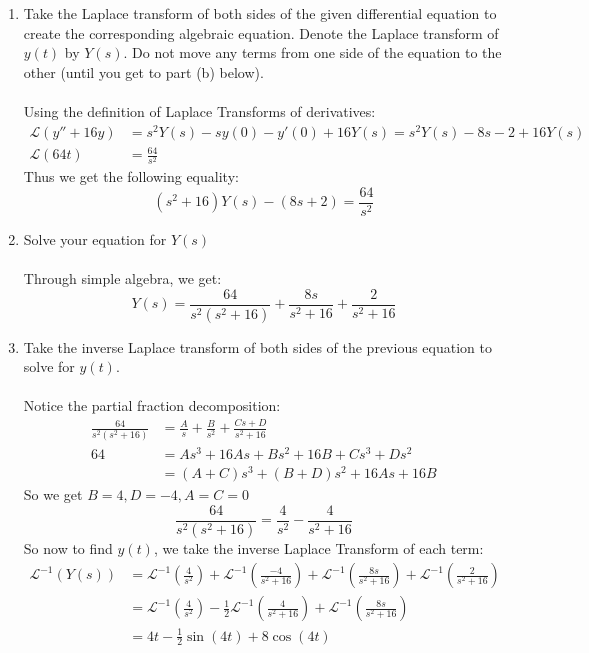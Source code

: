 \documentclass[12pt]{article}
\begin{document}
\begin{enumerate}[label = (\alph*)]
	\item Take the Laplace transform of both sides of the given differential equation to create the corresponding algebraic equation. Denote the Laplace transform of $y(t)$ by $Y(s)$. Do not move any terms from one side of the equation to the other (until you get to part (b) below).
	\\ \\
	Using the definition of Laplace Transforms of derivatives:
	\begin{align*}
		\mathcal{L}(y'' + 16y) &= s^2Y(s) - sy(0) - y'(0) + 16Y(s) = s^2Y(s) - 8s - 2 + 16Y(s) \\
		\mathcal{L}(64t) &= \frac{64}{s^2}
	\end{align*}
	Thus we get the following equality:
	$$
	(s^2 + 16)Y(s) - (8s + 2) = \frac{64}{s^2}
	$$
	\item Solve your equation for $Y(s)$
	\\ \\
	Through simple algebra, we get:
	$$
	Y(s) = \frac{64}{s^2(s^2 + 16)} + \frac{8s}{s^2 + 16} + \frac{2}{s^2 + 16}
	$$
	\item Take the inverse Laplace transform of both sides of the previous equation to solve for $y(t)$.
	\\ \\
	Notice the partial fraction decomposition:
	\begin{align*}
	\frac{64}{s^2(s^2 + 16)} &= \frac{A}{s} + \frac{B}{s^2} + \frac{Cs + D}{s^2+16} \\
	64 &= As^3 + 16As + Bs^2 + 16B + Cs^3 + Ds^2 \\
	&= (A+C)s^3 + (B+D)s^2 + 16As + 16B
	\end{align*}
	So we get $B = 4, D = -4, A = C = 0$
	$$
	\frac{64}{s^2(s^2 + 16)} = \frac{4}{s^2} - \frac{4}{s^2+16}
	$$
	So now to find $y(t)$, we take the inverse Laplace Transform of each term:
	\begin{align*}
	\mathcal{L}^{-1}(Y(s)) &= \mathcal{L}^{-1}\left(\frac{4}{s^2}\right) + \mathcal{L}^{-1}\left( \frac{-4}{s^2+16}\right) + \mathcal{L}^{-1}\left(\frac{8s}{s^2 + 16}\right) + \mathcal{L}^{-1}\left(\frac{2}{s^2 + 16}\right) \\
	&= \mathcal{L}^{-1}\left(\frac{4}{s^2}\right) - \frac{1}{2}\mathcal{L}^{-1}\left( \frac{4}{s^2+16}\right) + \mathcal{L}^{-1}\left(\frac{8s}{s^2 + 16}\right) \\
	&= 4t - \frac{1}{2}\sin(4t) + 8\cos(4t)
	\end{align*}
\end{enumerate}
\end{document}
